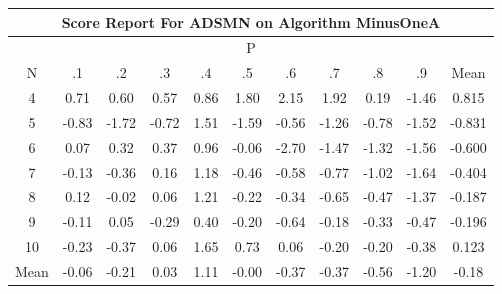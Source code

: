 \documentclass[11pt,a4paper]{report}
\begin{document}
\begin{longtable}{ | c || c | c | c | c | c | c | c | c | c || c |}
\hline
\multicolumn{11}{|c|}{ Score Report For ADSMN on Algorithm MinusOneA} \\
\hline
\multicolumn{11}{|c|}{ P } \\
\hline
N & .1 & .2 & .3 & .4 & .5 & .6 & .7 & .8 & .9 & Mean\\
 \hline
 \hline
 \endhead
  4 &  \cellcolor[HTML]{EFEFFF} 0.71 &  \cellcolor[HTML]{EFEFFF} 0.60 &  \cellcolor[HTML]{EFEFFF} 0.57 &  \cellcolor[HTML]{E7E7FF} 0.86 &  \cellcolor[HTML]{CFCFFF} 1.80 &  \cellcolor[HTML]{C7C7FF} 2.15 &  \cellcolor[HTML]{CFCFFF} 1.92 &  \cellcolor[HTML]{F7F7FF} 0.19 &  \cellcolor[HTML]{FFD7D7} -1.46 & 0.815 \\
  5 &  \cellcolor[HTML]{FFE7E7} -0.83 &  \cellcolor[HTML]{FFD7D7} -1.72 &  \cellcolor[HTML]{FFEFEF} -0.72 &  \cellcolor[HTML]{D7D7FF} 1.51 &  \cellcolor[HTML]{FFD7D7} -1.59 &  \cellcolor[HTML]{FFEFEF} -0.56 &  \cellcolor[HTML]{FFDFDF} -1.26 &  \cellcolor[HTML]{FFEFEF} -0.78 &  \cellcolor[HTML]{FFD7D7} -1.52 & -0.831 \\
  6 &  \cellcolor[HTML]{FFFFFF} 0.07 &  \cellcolor[HTML]{F7F7FF} 0.32 &  \cellcolor[HTML]{F7F7FF} 0.37 &  \cellcolor[HTML]{E7E7FF} 0.96 &  \cellcolor[HTML]{FFFFFF} -0.06 &  \cellcolor[HTML]{FFBFBF} -2.70 &  \cellcolor[HTML]{FFD7D7} -1.47 &  \cellcolor[HTML]{FFDFDF} -1.32 &  \cellcolor[HTML]{FFD7D7} -1.56 & -0.600 \\
  7 &  \cellcolor[HTML]{FFFFFF} -0.13 &  \cellcolor[HTML]{FFF7F7} -0.36 &  \cellcolor[HTML]{FFFFFF} 0.16 &  \cellcolor[HTML]{DFDFFF} 1.18 &  \cellcolor[HTML]{FFF7F7} -0.46 &  \cellcolor[HTML]{FFEFEF} -0.58 &  \cellcolor[HTML]{FFEFEF} -0.77 &  \cellcolor[HTML]{FFE7E7} -1.02 &  \cellcolor[HTML]{FFD7D7} -1.64 & -0.404 \\
  8 &  \cellcolor[HTML]{FFFFFF} 0.12 &  \cellcolor[HTML]{FFFFFF} -0.02 &  \cellcolor[HTML]{FFFFFF} 0.06 &  \cellcolor[HTML]{DFDFFF} 1.21 &  \cellcolor[HTML]{FFF7F7} -0.22 &  \cellcolor[HTML]{FFF7F7} -0.34 &  \cellcolor[HTML]{FFEFEF} -0.65 &  \cellcolor[HTML]{FFF7F7} -0.47 &  \cellcolor[HTML]{FFDFDF} -1.37 & -0.187 \\
  9 &  \cellcolor[HTML]{FFFFFF} -0.11 &  \cellcolor[HTML]{FFFFFF} 0.05 &  \cellcolor[HTML]{FFF7F7} -0.29 &  \cellcolor[HTML]{F7F7FF} 0.40 &  \cellcolor[HTML]{FFF7F7} -0.20 &  \cellcolor[HTML]{FFEFEF} -0.64 &  \cellcolor[HTML]{FFF7F7} -0.18 &  \cellcolor[HTML]{FFF7F7} -0.33 &  \cellcolor[HTML]{FFF7F7} -0.47 & -0.196 \\
  10 &  \cellcolor[HTML]{FFF7F7} -0.23 &  \cellcolor[HTML]{FFF7F7} -0.37 &  \cellcolor[HTML]{FFFFFF} 0.06 &  \cellcolor[HTML]{D7D7FF} 1.65 &  \cellcolor[HTML]{EFEFFF} 0.73 &  \cellcolor[HTML]{FFFFFF} 0.06 &  \cellcolor[HTML]{FFF7F7} -0.20 &  \cellcolor[HTML]{FFF7F7} -0.20 &  \cellcolor[HTML]{FFF7F7} -0.38 & 0.123 \\
 \hline
 \hline
Mean &  \cellcolor[HTML]{FFFFFF} -0.06 &  \cellcolor[HTML]{FFF7F7} -0.21 &  \cellcolor[HTML]{FFFFFF} 0.03 &  \cellcolor[HTML]{E7E7FF} 1.11 &  \cellcolor[HTML]{FFFFFF} -0.00 &  \cellcolor[HTML]{FFF7F7} -0.37 &  \cellcolor[HTML]{FFF7F7} -0.37 &  \cellcolor[HTML]{FFEFEF} -0.56 &  \cellcolor[HTML]{FFDFDF} -1.20 &  \cellcolor[HTML]{FFF7F7} -0.18
\end{longtable}
\end{document}
